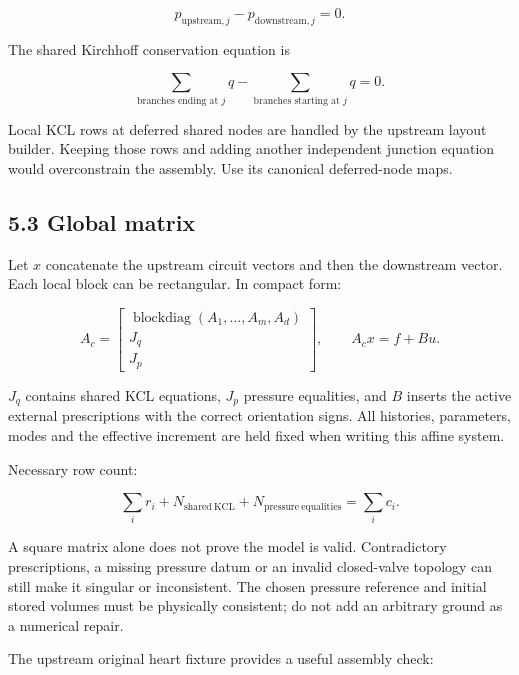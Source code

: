 \documentclass[11pt,a4paper]{article}
\begin{document}
\nopagebreak[3]
\[
p_{\mathrm{upstream},j}-p_{\mathrm{downstream},j}=0.
\]


The shared Kirchhoff conservation equation is


\nopagebreak[3]
\[
\sum_{\text{branches ending at }j}q
-\sum_{\text{branches starting at }j}q=0.
\]


Local KCL rows at deferred shared nodes are handled by the upstream layout builder. Keeping those rows and adding another independent junction equation would overconstrain the assembly. Use its canonical deferred-node maps.

\subsection{5.3 Global matrix}
Let \(x\) concatenate the upstream circuit vectors and then the downstream vector. Each local block can be rectangular. In compact form:


\nopagebreak[3]
\[
A_c=
\begin{bmatrix}
\operatorname{blockdiag}(A_1,\ldots,A_m,A_d)\\
J_q\\
J_p
\end{bmatrix},
\qquad A_c x=f+B u.
\]


\(J_q\) contains shared KCL equations, \(J_p\) pressure equalities, and \(B\) inserts the active external prescriptions with the correct orientation signs. All histories, parameters, modes and the effective increment are held fixed when writing this affine system.

Necessary row count:


\nopagebreak[3]
\[
\sum_i r_i+N_{\mathrm{shared\ KCL}}+N_{\mathrm{pressure\ equalities}}
=\sum_i c_i.
\]


A square matrix alone does not prove the model is valid. Contradictory prescriptions, a missing pressure datum or an invalid closed-valve topology can still make it singular or inconsistent. The chosen pressure reference and initial stored volumes must be physically consistent; do not add an arbitrary ground as a numerical repair.

The upstream original heart fixture provides a useful assembly check:
\end{document}
